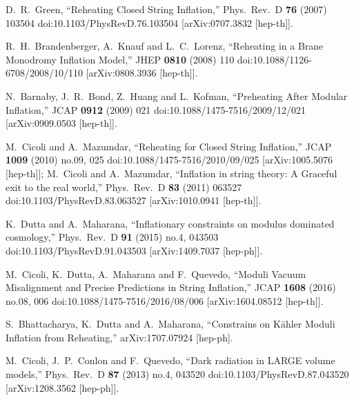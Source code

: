 \documentclass[11pt,a4paper]{article}
\begin{document}
\begin{thebibliography}{99}
  D.~R.~Green,
  ``Reheating Closed String Inflation,''
  Phys.\ Rev.\ D {\bf 76} (2007) 103504
  doi:10.1103/PhysRevD.76.103504
  [arXiv:0707.3832 [hep-th]].

  R.~H.~Brandenberger, A.~Knauf and L.~C.~Lorenz,
  ``Reheating in a Brane Monodromy Inflation Model,''
  JHEP {\bf 0810} (2008) 110
  doi:10.1088/1126-6708/2008/10/110
  [arXiv:0808.3936 [hep-th]].

  N.~Barnaby, J.~R.~Bond, Z.~Huang and L.~Kofman,
  ``Preheating After Modular Inflation,''
  JCAP {\bf 0912} (2009) 021
  doi:10.1088/1475-7516/2009/12/021
  [arXiv:0909.0503 [hep-th]].

  M.~Cicoli and A.~Mazumdar,
  ``Reheating for Closed String Inflation,''
  JCAP {\bf 1009} (2010) no.09,  025
  doi:10.1088/1475-7516/2010/09/025
  [arXiv:1005.5076 [hep-th]];
	M.~Cicoli and A.~Mazumdar,
  ``Inflation in string theory: A Graceful exit to the real world,''
  Phys.\ Rev.\ D {\bf 83} (2011) 063527
  doi:10.1103/PhysRevD.83.063527
  [arXiv:1010.0941 [hep-th]].

  K.~Dutta and A.~Maharana,
  ``Inflationary constraints on modulus dominated cosmology,''
  Phys.\ Rev.\ D {\bf 91} (2015) no.4,  043503
  doi:10.1103/PhysRevD.91.043503
  [arXiv:1409.7037 [hep-ph]].
  
  M.~Cicoli, K.~Dutta, A.~Maharana and F.~Quevedo,
  ``Moduli Vacuum Misalignment and Precise Predictions in String Inflation,''
  JCAP {\bf 1608} (2016) no.08,  006
  doi:10.1088/1475-7516/2016/08/006
  [arXiv:1604.08512 [hep-th]].	
	
  S.~Bhattacharya, K.~Dutta and A.~Maharana,
  ``Constrains on K\"ahler Moduli Inflation from Reheating,''
  arXiv:1707.07924 [hep-ph].	
	
  M.~Cicoli, J.~P.~Conlon and F.~Quevedo,
  ``Dark radiation in LARGE volume models,''
  Phys.\ Rev.\ D {\bf 87} (2013) no.4,  043520
  doi:10.1103/PhysRevD.87.043520
  [arXiv:1208.3562 [hep-ph]].
  

\end{thebibliography}
\end{document}
